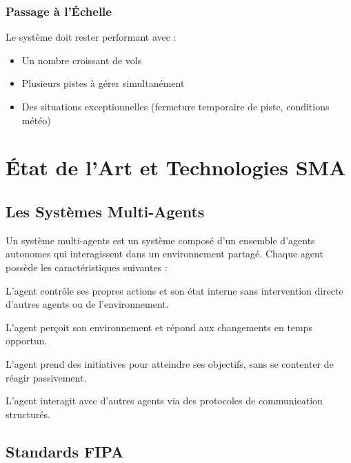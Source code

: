 \documentclass[12pt,a4paper]{article}
\begin{document}
\subsubsection{Passage à l'Échelle}

Le système doit rester performant avec :
\begin{itemize}[leftmargin=*]
    \item Un nombre croissant de vols
    \item Plusieurs pistes à gérer simultanément
    \item Des situations exceptionnelles (fermeture temporaire de piste, conditions météo)
\end{itemize}

\section{État de l'Art et Technologies SMA}

\subsection{Les Systèmes Multi-Agents}

Un système multi-agents est un système composé d'un ensemble d'agents autonomes qui interagissent dans un environnement partagé. Chaque agent possède les caractéristiques suivantes :

\begin{description}[style=nextline, leftmargin=0pt]
    \item[\color{primaryblue}Autonomie] L'agent contrôle ses propres actions et son état interne sans intervention directe d'autres agents ou de l'environnement.

    \item[\color{primaryblue}Réactivité] L'agent perçoit son environnement et répond aux changements en temps opportun.

    \item[\color{primaryblue}Pro-activité] L'agent prend des initiatives pour atteindre ses objectifs, sans se contenter de réagir passivement.

    \item[\color{primaryblue}Capacité sociale] L'agent interagit avec d'autres agents via des protocoles de communication structurés.
\end{description}

\subsection{Standards FIPA}
\end{document}

